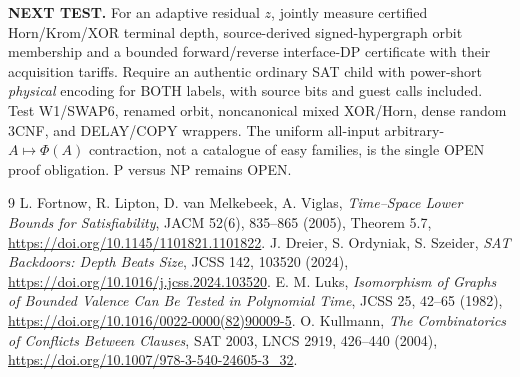 \documentclass[11pt]{article}
\begin{document}
\noindent\textbf{NEXT TEST.} For an adaptive residual $z$, jointly measure certified Horn/Krom/XOR terminal depth, source-derived signed-hypergraph orbit membership and a bounded forward/reverse interface-DP certificate with their acquisition tariffs. Require an authentic ordinary SAT child with power-short \emph{physical} encoding for BOTH labels, with source bits and guest calls included. Test W1/SWAP6, renamed orbit, noncanonical mixed XOR/Horn, dense random 3CNF, and DELAY/COPY wrappers. The uniform all-input arbitrary-$A\mapsto\Phi(A)$ contraction, not a catalogue of easy families, is the single OPEN proof obligation. P versus NP remains OPEN.

\begin{thebibliography}{9}
 L. Fortnow, R. Lipton, D. van Melkebeek, A. Viglas, \emph{Time--Space Lower Bounds for Satisfiability}, JACM 52(6), 835--865 (2005), Theorem 5.7, \url{https://doi.org/10.1145/1101821.1101822}.
 J. Dreier, S. Ordyniak, S. Szeider, \emph{SAT Backdoors: Depth Beats Size}, JCSS 142, 103520 (2024), \url{https://doi.org/10.1016/j.jcss.2024.103520}.
 E. M. Luks, \emph{Isomorphism of Graphs of Bounded Valence Can Be Tested in Polynomial Time}, JCSS 25, 42--65 (1982), \url{https://doi.org/10.1016/0022-0000(82)90009-5}.
 O. Kullmann, \emph{The Combinatorics of Conflicts Between Clauses}, SAT 2003, LNCS 2919, 426--440 (2004), \url{https://doi.org/10.1007/978-3-540-24605-3_32}.
\end{thebibliography}
\end{document}
